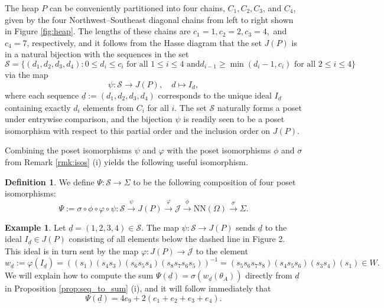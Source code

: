 \documentclass[11pt]{amsart}
\theoremstyle{plain}
\theoremstyle{definition}
\newtheorem{defn}[theorem]{Definition}
\newtheorem{exa}[theorem]{Example}
\theoremstyle{remark}
\numberwithin{equation}{section}
\newcommand{\ra}{\rightarrow}
\newcommand{\seqd}{\underline{d}}
\newcommand{\calj}{\mathcal{J}}
\newcommand{\cals}{\mathcal{S}}
\newcommand{\ob}{\Omega}
\newcommand{\nn}{\mathrm{NN}}
\newcommand{\inverse}{^{-1}}
\begin{document}
The heap $P$ can be conveniently partitioned into four chains, $C_1, C_2, C_3$,
and $C_4$, given by the four Northwest--Southeast diagonal chains from left to
right shown in Figure \ref{fig:heap}. The lengths of these chains are $c_1=1,
c_2=2, c_3=4,$ and $c_4=7$, respectively, and it follows from the Hasse diagram
that the set $J(P)$ is in a natural bijection with the sequences in the set 
\begin{equation}
\label{eq:seqs}
\cals=\{(d_1,d_2,d_3,d_4): 0 \le d_i\le c_i \text{ for all $1\le i\le 4$ and
$d_{i-1}\ge \min(d_i-1,c_i)$ for all $2\le i \le 4$}\}
\end{equation}
via the map 
\begin{equation}
\label{eq:seq_to_ideal}
\psi: \cals \ra J(P), \quad d\mapsto I_d,
\end{equation}
where each sequence $\seqd:=(d_1,d_2,d_3,d_4)$ corresponds to the unique ideal
$I_{\seqd}$
containing exactly $d_i$ elements from $C_i$ for all $i$. The set $\cals$ naturally forms a poset under entrywise
comparison, and the bijection $\psi$ is readily seen to be a poset isomorphism
with respect to this partial order and the inclusion order on $J(P)$.

Combining the poset isomorphisms $\psi$ and $\varphi$ with the poset isomorphisms
$\phi$ and $\sigma$ from Remark \ref{rmk:isos} (i) yields the following 
useful isomorphism.

\begin{defn}
\label{defn:iso_chain}
We define $\Psi: \cals\ra \Sigma$ to be the following composition of four poset
isomorphisms:
\begin{equation}
\label{eq:iso_chain}
 \Psi:= \sigma\circ \phi\circ \varphi\circ \psi: \cals\stackrel{\psi}{\ra} J(P) \stackrel{\varphi}{\ra} \calj
  \stackrel{\phi}{\ra} \nn(\ob)\stackrel{\sigma}{\ra} \Sigma.
\end{equation}
\end{defn}


\begin{exa}
\label{exa:bijections}
Let $\seqd=(1,2,3,4)\in \cals$. The map $\psi:\cals\ra J(P)$ sends $\seqd$ to the ideal
$I_{\seqd}\in J(P)$ consisting of all elements below the dashed line in Figure 2. This
ideal is in turn sent by the map $\varphi: J(P)\ra \calj$ to the element 
  \[ 
    w_{\seqd}:=\varphi(I_{\seqd})=  ((s_1)(s_4s_3)(s_6s_5s_4)(s_8s_7s_6s_5))\inverse=(s_5s_6s_7s_8)(s_4s_5s_6)(s_3s_4)(s_1)\in
W. \] 
We will explain how to compute the sum $\Psi(\seqd)=\sigma(w_{\seqd}(\theta_A))$
directly from $\seqd$ in
Proposition \ref{prop:seq_to_sum} (i), and it will follow immediately that  
\begin{equation}
\label{eq:max_fob_sum}
\Psi(\seqd)
=4e_9+2(e_1+e_2+e_3+e_4). 
\end{equation}
\end{exa}
\end{document}
